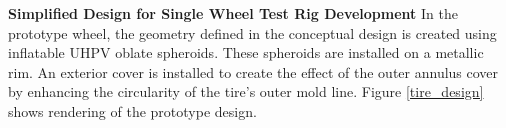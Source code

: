 \documentclass{article}
\begin{document}
\textbf{Simplified Design for Single Wheel Test Rig Development}
\newline
In the prototype wheel, the geometry defined in the conceptual design is created using inflatable UHPV oblate spheroids. These spheroids are installed on a metallic rim. An exterior cover is installed to create the effect of the outer annulus cover by enhancing the circularity of the tire's outer mold line. Figure \ref{tire_design} shows rendering of the prototype design.   

\begin{figure}[hbt!]
    \centering
    \begin{minipage}{0.32\textwidth}
        \centering
    \end{minipage}
    \begin{minipage}{0.32\textwidth}
        \centering

\end{minipage}
\end{figure}
\end{document}
